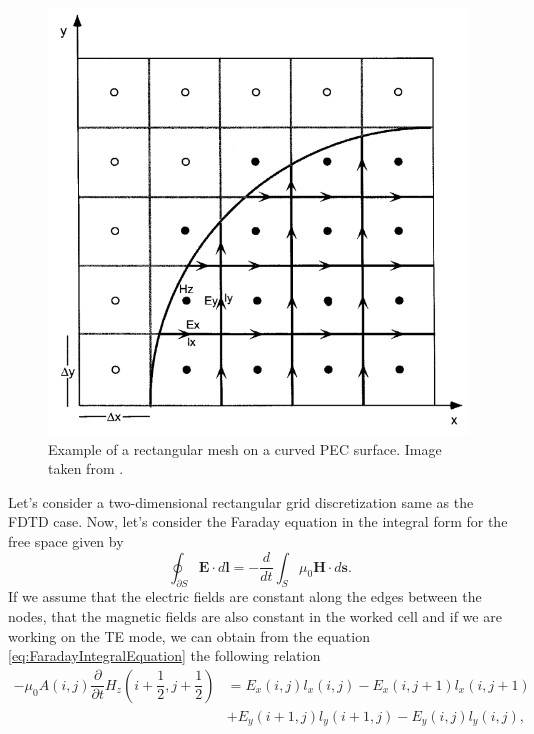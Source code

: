 \documentclass[12pt, oneside]{book}
\begin{document}
\begin{figure}[H]
    \centering
    \includegraphics[scale=1.0]{Imagenes/DeyMittra_2DMeshExample.jpg}
    \caption{Example of a rectangular mesh on a curved PEC surface. Image taken from \cite{Dey1997ALC}.}
    \label{fig:DeyMittraMesh}
\end{figure}
Let's consider a two-dimensional rectangular grid discretization same as the FDTD case. Now, let's consider the Faraday equation in the integral form for the free space given by
\begin{equation}
    \oint_{\partial S} \boldsymbol{E} \cdot d \boldsymbol{l} = -\dfrac{d}{dt} \int_{S} \mu_0 \boldsymbol{H} \cdot d\boldsymbol{s}.
    \label{eq:FaradayIntegralEquation}
\end{equation}
If we assume that the electric fields are constant along the edges between the nodes, that the magnetic fields are also constant in the worked cell and if we are working on the TE mode, we can obtain from the equation \ref{eq:FaradayIntegralEquation} the following relation
\begin{equation}
\begin{aligned}
    -\mu_0  A(i,j)\dfrac{\partial}{\partial t} H_z\left( i + \dfrac{1}{2}, j + \dfrac{1}{2} \right) &= E_x(i,j) l_x(i,j) - E_x(i,j+1) l_x(i,j+1) \\
                                                                                                   &+ E_y(i+1,j) l_y(i+1,j) - E_y(i,j) l_y(i,j),  
\end{aligned}
\label{eq:FaradayIntegralEquationRectangularGrid}
\end{equation}
\end{document}
